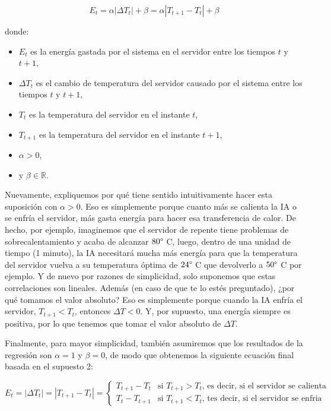 \documentclass[]{book}
\providecommand{\tightlist}{%
  \setlength{\itemsep}{0pt}\setlength{\parskip}{0pt}}
\begin{document}
\[E_t = \alpha |\Delta T_t| + \beta = \alpha |T_{t+1} - T_t| + \beta\]

donde:

\begin{itemize}
\tightlist
\item
  \(E_t\) es la energía gastada por el sistema en el servidor entre los tiempos \(t\) y \(t +1\),
\item
  \(\Delta T_t\) es el cambio de temperatura del servidor causado por el sistema entre los tiempos \(t\) y \(t +1\),
\item
  \(T_t\) es la temperatura del servidor en el instante \(t\),
\item
  \(T_{t + 1}\) es la temperatura del servidor en el instante \(t +1\),
\item
  \(\alpha > 0\),
\item
  y \(\beta \in \mathbb{R}\).
\end{itemize}

Nuevamente, expliquemos por qué tiene sentido intuitivamente hacer esta suposición con \(\alpha>0\). Eso es simplemente porque cuanto más se calienta la IA o se enfría el servidor, más gasta energía para hacer esa transferencia de calor. De hecho, por ejemplo, imaginemos que el servidor de repente tiene problemas de sobrecalentamiento y acaba de alcanzar \(80 \degree\) C, luego, dentro de una unidad de tiempo (1 minuto), la IA necesitará mucha más energía para que la temperatura del servidor vuelva a su temperatura óptima de \(24 \degree\) C que devolverlo a \(50 \degree\) C por ejemplo. Y de nuevo por razones de simplicidad, solo suponemos que estas correlaciones son lineales. Además (en caso de que te lo estés preguntado), ¿por qué tomamos el valor absoluto? Eso es simplemente porque cuando la IA enfría el servidor, \(T_{t + 1}<T_t\), entonces \(\Delta T <0\). Y, por supuesto, una energía siempre es positiva, por lo que tenemos que tomar el valor absoluto de \(\Delta T\).

Finalmente, para mayor simplicidad, también asumiremos que los resultados de la regresión son \(\alpha = 1\) y \(\beta = 0\), de modo que obtenemos la siguiente ecuación final basada en el supuesto 2:

\begin{equation*}
E_t = |\Delta T_t| = |T_{t+1} - T_t| =
\begin{cases}
T_{t+1} - T_t & \textrm{si $T_{t+1} > T_t$, es decir, si el servidor se calienta} \\
T_t - T_{t+1} & \textrm{si $T_{t+1} < T_t$, tes decir, si el servidor se enfria}
\end{cases}
\end{equation*}
\end{document}
